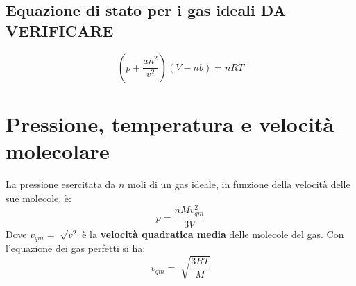         \subsection{Equazione di stato per i gas ideali DA VERIFICARE}
            \begin{equation}
                (p + \frac{an^2}{v^2})(V - nb) = nRT
            \end{equation}

    \section{Pressione, temperatura e velocità molecolare} La pressione 
    esercitata da $n$ moli di un gas ideale, in funzione della velocità delle
    sue molecole, è:
            \begin{equation}
                p = \frac{nMv^2_{qm}}{3V}
            \end{equation}
    Dove $v_{qm} = \sqrt[]{v^2}$ è la \textbf{velocità quadratica media} delle
    molecole del gas. Con l'equazione dei gas perfetti si ha:
            \begin{equation}
                v_{qm} = \sqrt[]{\frac{3RT}{M}}
            \end{equation}